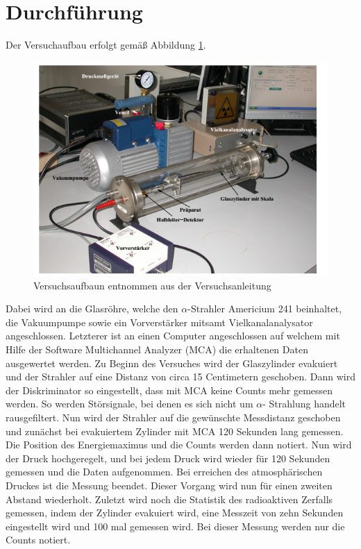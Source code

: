 \section{Durchführung}
\label{sec:Durchführung}
Der Versuchaufbau erfolgt gemäß Abbildung \ref{fig:aufbau}.
\begin{figure}
  \centering
  \includegraphics{images/aufbau.png}
  \caption{Versuchsaufbaun entnommen aus der Versuchsanleitung \cite{1}}
  \label{fig:aufbau}
\end{figure}
Dabei wird an die Glasröhre, welche den $\alpha$-Strahler Americium 241 beinhaltet, die Vakuumpumpe sowie ein Vorverstärker mitsamt Vielkanalanalysator angeschlossen.
Letzterer ist an einen Computer angeschlossen auf welchem mit Hilfe der Software Multichannel Analyzer (MCA) die erhaltenen Daten ausgewertet werden.
Zu Beginn des Versuches wird der Glaszylinder evakuiert und der Strahler auf eine Distanz von circa 15 Centimetern geschoben.
Dann wird der Diskriminator so eingestellt, dass mit MCA keine Counts mehr gemessen werden. So werden Störsignale, bei denen es sich nicht um $\alpha$- Strahlung handelt
rausgefiltert. Nun wird der Strahler auf die gewünschte Messdistanz geschoben und zunächst bei evakuiertem Zylinder mit MCA 120 Sekunden lang gemessen. Die Position des
Energiemaximus und die Counts werden dann notiert. Nun wird der Druck hochgeregelt, und bei jedem Druck wird wieder für 120 Sekunden gemessen und die Daten aufgenommen.
Bei erreichen des atmosphärischen Druckes ist die Messung beendet. Dieser Vorgang wird nun für einen zweiten Abstand wiederholt.
Zuletzt wird noch die Statistik des radioaktiven Zerfalls gemessen, indem der Zylinder evakuiert wird, eine Messzeit von zehn Sekunden eingestellt wird und 100 mal gemessen wird.
Bei dieser Messung werden nur die Counts notiert.
